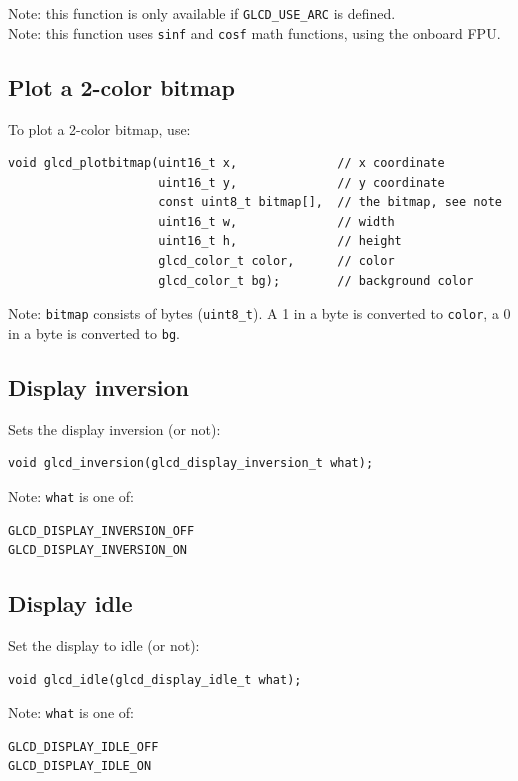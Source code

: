 \documentclass[12pt]{article}
\begin{document}
Note: this function is only available if \lstinline|GLCD_USE_ARC| is defined.\\
Note: this function uses \lstinline|sinf| and \lstinline|cosf| math functions, using the onboard FPU.

\subsection{Plot a 2-color bitmap}
To plot a 2-color bitmap, use:
\begin{lstlisting}
void glcd_plotbitmap(uint16_t x,              // x coordinate
                     uint16_t y,              // y coordinate
                     const uint8_t bitmap[],  // the bitmap, see note
                     uint16_t w,              // width
                     uint16_t h,              // height
                     glcd_color_t color,      // color
                     glcd_color_t bg);        // background color
\end{lstlisting}

Note: \lstinline|bitmap| consists of bytes (\lstinline|uint8_t|). A 1 in a byte is converted to \lstinline|color|, a 0 in a byte is converted to \lstinline|bg|.

\subsection{Display inversion}
Sets the display inversion (or not):
\begin{lstlisting}
void glcd_inversion(glcd_display_inversion_t what);
\end{lstlisting}

Note: \lstinline|what| is one of:
\begin{lstlisting}
GLCD_DISPLAY_INVERSION_OFF
GLCD_DISPLAY_INVERSION_ON
\end{lstlisting}

\subsection{Display idle}
Set the display to idle (or not):
\begin{lstlisting}
void glcd_idle(glcd_display_idle_t what);
\end{lstlisting}

Note: \lstinline|what| is one of:

\begin{lstlisting}
GLCD_DISPLAY_IDLE_OFF
GLCD_DISPLAY_IDLE_ON
\end{lstlisting}
\end{document}
